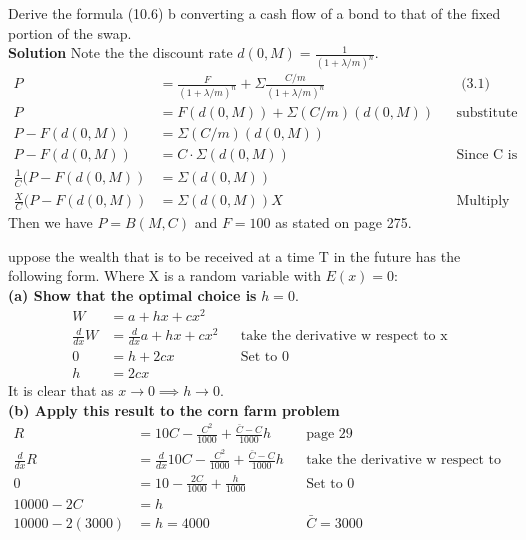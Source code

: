 \documentclass[12pt]{article}
\newenvironment{problem}[3][Problem]{\begin{trivlist}
\item[\hskip \labelsep {\bfseries #1}\hskip \labelsep {\bfseries #2.}]}{\end{trivlist}}
\newcommand{\ddx}{\frac{d}{dx}}
\begin{document}
\newpage
\begin{problem}{8 (Simple Formula)}.  Derive the formula (10.6) b converting a cash flow of a bond to that of the fixed portion of the swap. \\
\textbf{Solution} Note the the discount rate $d(0,M)=\frac{1}{(1+\lambda / m)^n}$. 
\begin{align*}
P &= \frac{F}{(1+\lambda / m)^n} + \Sigma \frac{C/m}{(1+\lambda / m)^n}  && \text{ (3.1) page 53} \\ 
P &= F(d(0,M)) + \Sigma (C/m)(d(0,M)) && \text{substitute} \\ 
P - F(d(0,M)) &= \Sigma (C/m)(d(0,M)) \\ 
P - F(d(0,M)) &= C \cdot \Sigma (d(0,M)) && \text{Since C is constant} \\ 
\frac{1}{C} (P - F(d(0,M)) &= \Sigma (d(0,M)) \\
\frac{X}{C} (P - F(d(0,M))&= \Sigma(d(0,M)) X &&\text{Multiply by x?} 
\end{align*}
Then we have $P=B(M,C)$ and $F=100$ as stated on page 275. 
\end{problem}

\newpage
\begin{problem}{18 (Symmetric Probability)} Suppose the wealth that is to be received at a time T in the future has the following form. Where X is a random variable with $E(x)=0$: \\
\textbf{(a) Show that the optimal choice is} $h=0$. 
\begin{align*}
W &= a + hx + cx^2 \\
\ddx W &= \ddx a + hx + cx^2 && \text{take the derivative w respect to x} \\
0 &= h + 2cx && \text{Set to 0} \\
h &= 2cx
\end{align*}
It is clear that as $x \rightarrow 0 \implies h \rightarrow 0.$\\ 
\textbf{(b) Apply this result to the corn farm problem } 
\begin{align*}
R &= 10C - \frac{C^2}{1000} + \frac{\bar{C}-C}{1000}h && \text{page 29} \\
\ddx R &= \ddx 10C - \frac{C^2}{1000} + \frac{\bar{C}-C}{1000}h && \text{take the derivative w respect to C} \\
0&= 10 - \frac{2C}{1000} + \frac{h}{1000} && \text{Set to 0} \\
10000-2C &= h \\
10000 - 2(3000) &= h = 4000 && \bar{C} = 3000
\end{align*}

\end{problem}
\end{document}

